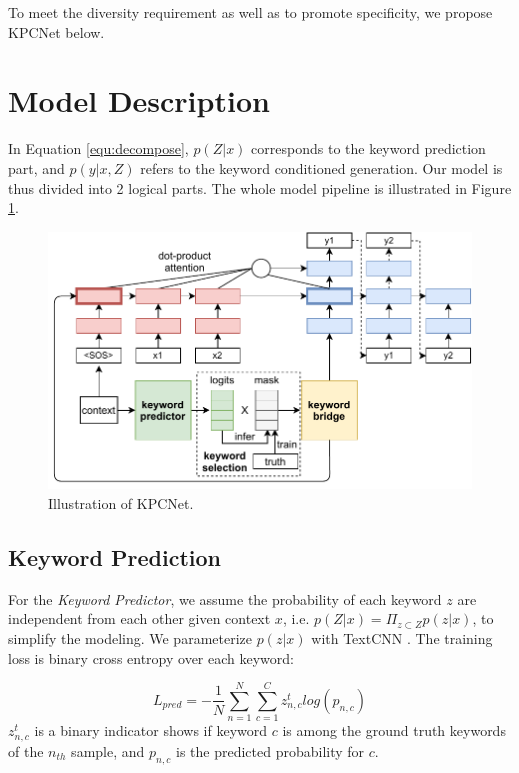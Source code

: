 \documentclass[letterpaper]{article} %
\begin{document}
To meet the diversity requirement as well as to promote specificity, we propose KPCNet below.


\section{Model Description}
\label{sec:KPCNet}
In Equation \ref{equ:decompose}, $p(Z|x)$ corresponds to the keyword prediction part, and $p(y|x,Z)$ refers to the keyword conditioned generation. Our model is thus divided into 2 logical parts. The whole model pipeline is illustrated in Figure \ref{fig:pipeline}. 


\begin{figure}[htbp]
  \centering
  \includegraphics[width=1\linewidth]{kwd_model.pdf}
  \caption{Illustration of KPCNet.}
  \label{fig:pipeline}
  \end{figure}

\subsection{Keyword Prediction}

For the \textit{Keyword Predictor}, we assume the probability of each keyword $z$ are independent from each other given context $x$, i.e. $p(Z|x)=\Pi_{z \subset Z}p(z|x)$, to simplify the modeling. We parameterize $p(z|x)$ with TextCNN \citep{kim-2014-convolutional}. The training loss is binary cross entropy over each keyword:

\begin{equation}
  L_{pred} = -\frac{1}{N}\sum_{n=1}^{N}\sum_{c=1}^{C}z^t_{n,c}log(p_{n,c})
  \label{equ:pred}
\end{equation}
$z^t_{n,c}$ is a binary indicator shows if keyword $c$ is among the ground truth keywords of the $n_{th}$ sample, and $p_{n,c}$ is the predicted probability for $c$.
\end{document}
